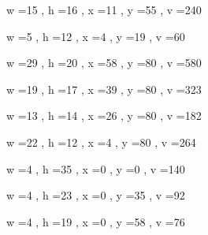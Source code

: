 \documentclass[11pt]{article}
\begin{document}
\par
w =15 , h =16 , x =11 , y =55 , v =240
\par
w =5 , h =12 , x =4 , y =19 , v =60
\par
w =29 , h =20 , x =58 , y =80 , v =580
\par
w =19 , h =17 , x =39 , y =80 , v =323
\par
w =13 , h =14 , x =26 , y =80 , v =182
\par
w =22 , h =12 , x =4 , y =80 , v =264
\par
w =4 , h =35 , x =0 , y =0 , v =140
\par
w =4 , h =23 , x =0 , y =35 , v =92
\par
w =4 , h =19 , x =0 , y =58 , v =76
\par
\newpage
\end{document}
